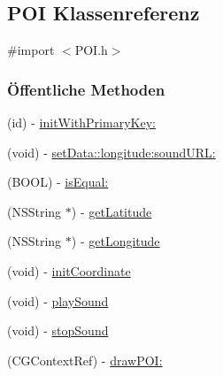 \hypertarget{interface_p_o_i}{
\subsection{POI Klassenreferenz}
\label{interface_p_o_i}
}


{\ttfamily \#import $<$POI.h$>$}\subsubsection*{Öffentliche Methoden}
\begin{DoxyCompactItemize}
\item 
(id) -\/ \hyperlink{interface_p_o_i_aee6d78e0d5b6e4b317658b60357d5c18}{initWithPrimaryKey:}
\item 
(void) -\/ \hyperlink{interface_p_o_i_a73115928aaa3772b6e482351d445494a}{setData::longitude:soundURL:}
\item 
(BOOL) -\/ \hyperlink{interface_p_o_i_ae12986cb3bc704b2665f777d0ded8ed9}{isEqual:}
\item 
(NSString $\ast$) -\/ \hyperlink{interface_p_o_i_a11d6d0525235d6c73f1b8e325bd0a2b4}{getLatitude}
\item 
(NSString $\ast$) -\/ \hyperlink{interface_p_o_i_abc66c92ee38bb7431e259d9b7dd0dde5}{getLongitude}
\item 
(void) -\/ \hyperlink{interface_p_o_i_a2795a2a1abea75196a40f4af9c8f8819}{initCoordinate}
\item 
(void) -\/ \hyperlink{interface_p_o_i_a30959e0dbc986b8eb13751f937f48e71}{playSound}
\item 
(void) -\/ \hyperlink{interface_p_o_i_aa569ca00c6e3ab1176a5279bbd986255}{stopSound}
\item 
(CGContextRef) -\/ \hyperlink{interface_p_o_i_a40163280cbdbb8ec60a6a00fcd6babbe}{drawPOI:}
\end{DoxyCompactItemize}
